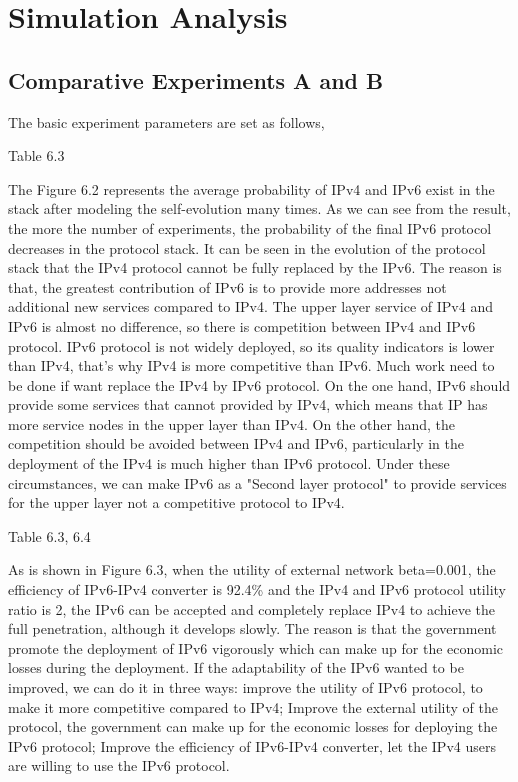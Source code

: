\documentclass{article}
\begin{document}
\section{Simulation Analysis}
\subsection{Comparative Experiments A and B}
The basic experiment parameters are set as follows,

Table 6.3

The Figure 6.2 represents the average probability of IPv4 and IPv6 exist in the stack after modeling the self-evolution
many times. As we can see from the result, the more the number of experiments, the probability of the final IPv6 protocol
decreases in the protocol stack. It can be seen in the evolution of the protocol stack that the IPv4 protocol cannot be
fully replaced by the IPv6. The reason is that, the greatest contribution of IPv6 is to provide more addresses not
additional new services compared to IPv4. The upper layer service of IPv4 and IPv6 is almost no difference,  so there
is competition between IPv4 and IPv6 protocol. IPv6 protocol is not widely deployed, so its quality indicators is lower
than IPv4, that's why IPv4 is more competitive than IPv6. Much work need to be done if want replace the IPv4 by IPv6
protocol. On the one hand, IPv6 should provide some services that cannot provided by IPv4, which means that IP has more
service nodes in the upper layer than IPv4. On the other hand, the competition should be avoided between IPv4 and IPv6,
particularly in the deployment of the IPv4 is much higher than IPv6 protocol. Under these circumstances, we can make
IPv6 as a "Second layer protocol" to provide services for the upper layer not a competitive protocol to IPv4.

Table 6.3, 6.4

As is shown in Figure 6.3, when the utility of external network beta=0.001, the efficiency of IPv6-IPv4 converter is 92.4\%
and the IPv4 and IPv6 protocol utility ratio is 2, the IPv6 can be accepted and completely replace IPv4 to achieve the full
penetration, although it develops slowly.   The reason is that the government promote the deployment of IPv6 vigorously which
can make up for the economic losses during the deployment. If the adaptability of the IPv6 wanted to be improved, we can do
it in three ways: improve the utility of IPv6 protocol, to make it more competitive compared to IPv4; Improve the external
utility of the protocol, the government can make up for the economic losses for deploying the IPv6 protocol; Improve the
efficiency of IPv6-IPv4 converter, let the IPv4 users are willing to use the IPv6 protocol.
\end{document}
